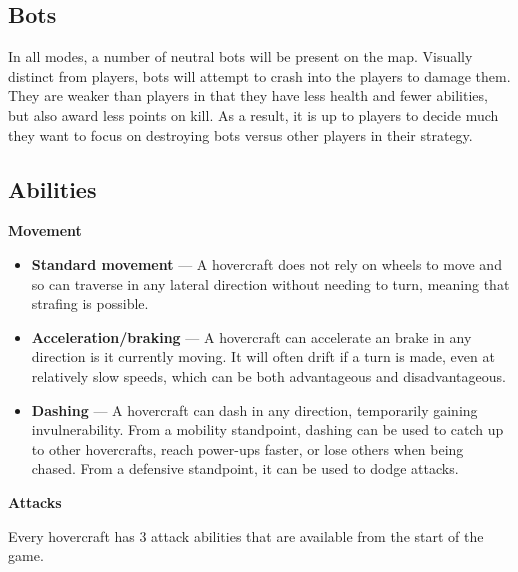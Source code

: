 \documentclass{article}
\theoremstyle{definition}
\begin{document}
\subsection{Bots}

In all modes, a number of neutral bots will be present on the map. Visually
distinct from players, bots will attempt to crash into the players to damage
them. They are weaker than players in that they have less health and fewer
abilities, but also award less points on kill. As a result, it is up to players
to decide much they want to focus on destroying bots versus other players in
their strategy.

\subsection{Abilities}

\textbf{Movement}

\begin{itemize}
  \item \textbf{Standard movement} --- A hovercraft does not rely on wheels to
    move and so can traverse in any lateral direction without needing to turn,
    meaning that strafing is possible.
  \item \textbf{Acceleration/braking} --- A hovercraft can accelerate an brake
    in any direction is it currently moving. It will often drift if a turn is
    made, even at relatively slow speeds, which can be both advantageous and
    disadvantageous.
  \item \textbf{Dashing} --- A hovercraft can dash in any direction,
    temporarily gaining invulnerability. From a mobility standpoint, dashing
    can be used to catch up to other hovercrafts, reach power-ups faster, or
    lose others when being chased. From a defensive standpoint, it can be used
    to dodge attacks.
\end{itemize}

\textbf{Attacks}

Every hovercraft has 3 attack abilities that are available from the start of
the game.
\end{document}
